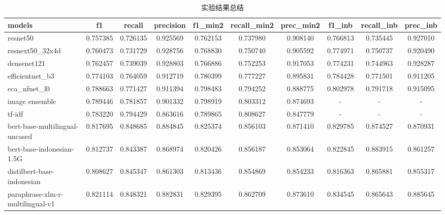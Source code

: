 \documentclass[12pt]{article}
\begin{document}
\begin{table}
  \centering
  \footnotesize
	\caption{实验结果总结}
  \label{tab:results_summary}
	\begin{tabular}{lccccccccc}
    \toprule
    models                           & f1       & recall   & precision & f1\_min2 & recall\_min2 & prec\_min2 & f1\_inb  & recall\_inb & prec\_inb \\
    \midrule
    resnet50                         & 0.757385 & 0.726135 & 0.925569  & 0.762153 & 0.737980     & 0.908140        & 0.766813 & 0.735445    & 0.927010       \\
    resnext50\_32x4d                 & 0.760473 & 0.731729 & 0.928756  & 0.768830 & 0.750740     & 0.905592        & 0.774971 & 0.750737    & 0.920490       \\
    densenet121                      & 0.762457 & 0.739039 & 0.928803  & 0.766886 & 0.752253     & 0.917053        & 0.774231 & 0.744963    & 0.928287       \\
    efficientnet\_b3                 & 0.774103 & 0.764059 & 0.912719  & 0.780399 & 0.777227     & 0.895831        & 0.784428 & 0.771501    & 0.911205       \\
    eca\_nfnet\_l0                   & 0.788663 & 0.771427 & 0.911394  & 0.798483 & 0.794252     & 0.888775        & 0.802978 & 0.791718    & 0.915095       \\
    image ensemble                   & 0.789446 & 0.781857 & 0.901332  & 0.798919 & 0.803312     & 0.874693        & -        & -           & -              \\
    tf-idf                           & 0.783220 & 0.794429 & 0.863616  & 0.789865 & 0.808627     & 0.847779        & -        & -           & -              \\
    bert-base-multilingual-uncased   & 0.817695 & 0.848685 & 0.884845  & 0.825374 & 0.856103     & 0.871410        & 0.829785 & 0.874527    & 0.870931       \\
    bert-base-indonesian-1.5G        & 0.812737 & 0.843387 & 0.868974  & 0.820426 & 0.856187     & 0.853064        & 0.822845 & 0.883915    & 0.861257       \\
    distilbert-base-indonesian       & 0.808627 & 0.845347 & 0.861303  & 0.813436 & 0.854869     & 0.854233        & 0.816363 & 0.865881    & 0.855317       \\
    paraphrase-xlm-r-multilingual-v1 & 0.821114 & 0.848321 & 0.882831  & 0.829395 & 0.862709     & 0.873610        & 0.834545 & 0.865643    & 0.885645       \\

\end{tabular}
\end{table}
\end{document}
